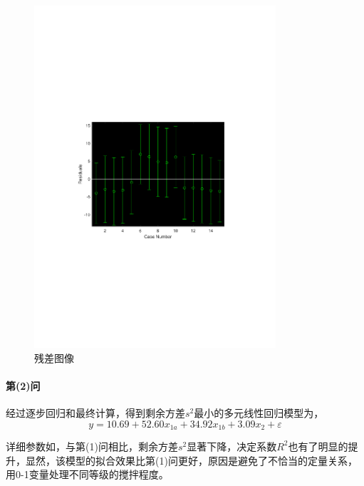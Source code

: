 \begin{figure}[H]
    \centering
    \includegraphics[width=0.8\textwidth,trim={3.09cm 9.295cm 3.09cm 9.295cm},clip]{fig/ex9_x1_rcoplot.pdf}
    \caption{残差图像}
    \label{fig:ex9_x1_rcoplot}
\end{figure}

\paragraph{第(2)问} 经过逐步回归和最终计算，得到剩余方差$s^2$最小的多元线性回归模型为，
\begin{equation}\label{eq:ex9_x1ab_linear}
    y = 10.69 + 52.60 x_{1a} + 34.92 x_{1b} + 3.09 x_2 + \varepsilon
\end{equation}

详细参数如，与第(1)问相比，剩余方差$s^2$显著下降，决定系数$R^2$也有了明显的提升，显然，该模型的拟合效果比第(1)问更好，原因是避免了不恰当的定量关系，用0-1变量处理不同等级的搅拌程度。

